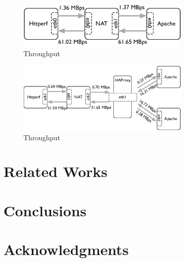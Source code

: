 \documentclass{sig-alternate-10pt}
\begin{document}
\begin{figure}[t]
\label{cdf}
\centering
\includegraphics[width=3.3in]{throughput_chain1.eps}
\caption{Throughput}
\end{figure}

\begin{figure}[t]
\label{cdf}
\centering
\includegraphics[width=3.3in]{throughput_chain2.eps}
\caption{Throughput}
\end{figure}

\section{Related Works}
\section{Conclusions}


\section{Acknowledgments}
\end{document}
